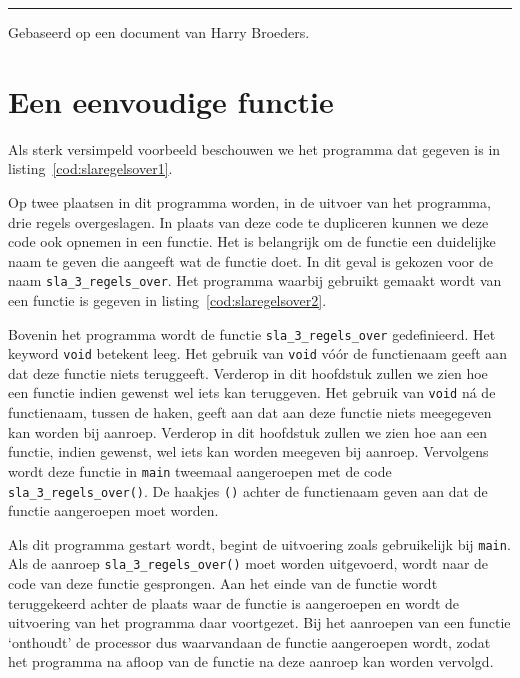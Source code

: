 \vfill
\hrule width 2in \relax
{\footnotesize Gebaseerd op een document van Harry Broeders.}


\section{Een eenvoudige functie}
Als sterk versimpeld voorbeeld beschouwen we het programma dat gegeven is in listing~\ref{cod:slaregelsover1}.


Op twee plaatsen in dit programma worden, in de uitvoer van het programma, drie regels overgeslagen.
In plaats van deze code te dupliceren kunnen we deze code ook opnemen in een functie.
Het is belangrijk om de functie een duidelijke naam te geven die aangeeft wat de functie doet.
In dit geval is gekozen voor de naam \texttt{sla\_3\_regels\_over}.
Het programma waarbij gebruikt gemaakt wordt van een functie is gegeven in listing~\ref{cod:slaregelsover2}.


Bovenin het programma wordt de functie \texttt{sla\_3\_regels\_over} gedefinieerd.
Het keyword \texttt{void} betekent leeg.
Het gebruik van \texttt{void} vóór de functienaam geeft aan dat deze functie niets teruggeeft.
Verderop in dit hoofdstuk zullen we zien hoe een functie indien gewenst wel iets kan teruggeven.
Het gebruik van \texttt{void} n\'a de functienaam, tussen de haken, geeft aan dat aan deze functie niets meegegeven kan worden bij aanroep. 
Verderop in dit hoofdstuk zullen we zien hoe aan een functie, indien gewenst, wel iets kan worden meegeven bij aanroep.
Vervolgens wordt deze functie in \texttt{main} tweemaal aangeroepen met de code \texttt{sla\_3\_regels\_over()}.
De haakjes \texttt{()} achter de functienaam geven aan dat de functie aangeroepen moet worden.
 
Als dit programma gestart wordt, begint de uitvoering zoals gebruikelijk bij \texttt{main}.
Als de aanroep \texttt{sla\_3\_regels\_over()} moet worden uitgevoerd, wordt naar de code van deze functie gesprongen.
Aan het einde van de functie wordt teruggekeerd achter de plaats waar de functie is aangeroepen en wordt de uitvoering van het programma daar voortgezet.
Bij het aanroepen van een functie `onthoudt' de processor dus waarvandaan de functie aangeroepen wordt, zodat het programma na afloop van de functie na deze aanroep kan worden vervolgd.

